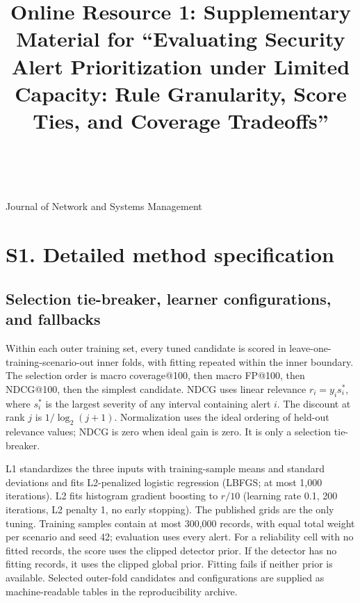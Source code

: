 \documentclass[pdflatex,sn-basic,Numbered]{sn-jnl}
\begin{document}
\title{Online Resource 1: Supplementary Material for ``Evaluating Security Alert Prioritization under Limited Capacity: Rule Granularity, Score Ties, and Coverage Tradeoffs''}

\author*{ \,}
\maketitle

\noindent Journal of Network and Systems Management

\section*{S1. Detailed method specification}

\subsection*{Selection tie-breaker, learner configurations, and fallbacks}
Within each outer training set, every tuned candidate is scored in leave-one-training-scenario-out inner folds, with fitting repeated within the inner boundary. The selection order is macro coverage@100, then macro FP@100, then NDCG@100, then the simplest candidate. NDCG uses linear relevance $r_i=y_i s_i^*$, where $s_i^*$ is the largest severity of any interval containing alert $i$. The discount at rank $j$ is $1/\log_2(j+1)$. Normalization uses the ideal ordering of held-out relevance values; NDCG is zero when ideal gain is zero. It is only a selection tie-breaker.

L1 standardizes the three inputs with training-sample means and standard deviations and fits L2-penalized logistic regression (LBFGS; at most 1,000 iterations). L2 fits histogram gradient boosting to $r/10$ (learning rate 0.1, 200 iterations, L2 penalty 1, no early stopping). The published grids are the only tuning. Training samples contain at most 300,000 records, with equal total weight per scenario and seed 42; evaluation uses every alert. For a reliability cell with no fitted records, the score uses the clipped detector prior. If the detector has no fitting records, it uses the clipped global prior. Fitting fails if neither prior is available. Selected outer-fold candidates and configurations are supplied as machine-readable tables in the reproducibility archive.
\end{document}
